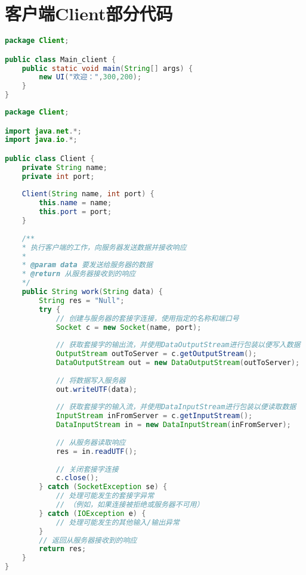 \newpage
\section{客户端Client部分代码}
\begin{lstlisting}[language = java, caption = Main\_Client.java]
package Client;

public class Main_client {
	public static void main(String[] args) {
		new UI("欢迎：",300,200);
	}
}
\end{lstlisting}
\begin{lstlisting}[language = java, caption = Client.java]
package Client;

import java.net.*;
import java.io.*;

public class Client {
	private String name;
	private int port;
	
	Client(String name, int port) {
		this.name = name;
		this.port = port;
	}
	
	/**
	* 执行客户端的工作，向服务器发送数据并接收响应
	* 
	* @param data 要发送给服务器的数据
	* @return 从服务器接收到的响应
	*/
	public String work(String data) {
		String res = "Null";
		try {
			// 创建与服务器的套接字连接，使用指定的名称和端口号
			Socket c = new Socket(name, port);
			
			// 获取套接字的输出流，并使用DataOutputStream进行包装以便写入数据
			OutputStream outToServer = c.getOutputStream();
			DataOutputStream out = new DataOutputStream(outToServer);
			
			// 将数据写入服务器
			out.writeUTF(data);
			
			// 获取套接字的输入流，并使用DataInputStream进行包装以便读取数据
			InputStream inFromServer = c.getInputStream();
			DataInputStream in = new DataInputStream(inFromServer);
			
			// 从服务器读取响应
			res = in.readUTF();
			
			// 关闭套接字连接
			c.close();
		} catch (SocketException se) {
			// 处理可能发生的套接字异常
			// （例如，如果连接被拒绝或服务器不可用）
		} catch (IOException e) {
			// 处理可能发生的其他输入/输出异常
		}
		// 返回从服务器接收到的响应
		return res;
	}
}
\end{lstlisting}
